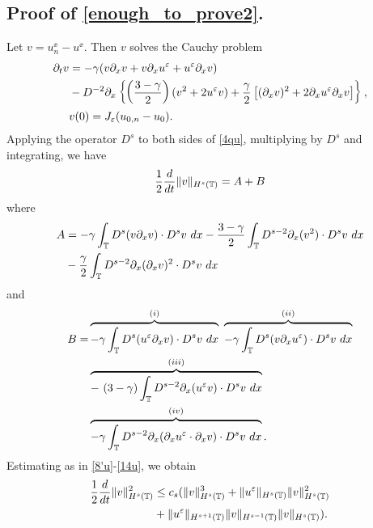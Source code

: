 \subsection{Proof of \eqref{enough_to_prove2}.} 
Let $v = u^\ee_n - u^\ee$. Then $v$ solves the Cauchy problem
\begin{align}
\label{4qu}
\partial_t v 
& =  -\gamma (v \partial_x v + v \partial_x u^\varepsilon + u^\varepsilon \partial_x v)  
\\
& - D^{-2} \partial_x \left\{ \left (\frac{3-\gamma}{2} \right )(v^2 +
2u^\varepsilon v) + \frac{\gamma}{2}\left[ (\partial_x v)^2 + 2 \partial_x u^\varepsilon \partial_x v \right]
\right\}, \notag
\\
& v(0) =J_\varepsilon(u_{0,n} - u_0).
\label{5qu}
\end{align}
Applying the operator $D^s$ to both sides of \eqref{4qu}, multiplying by
$D^s$ and integrating, we have
\begin{equation}
\begin{split}
\frac{1}{2}\frac{d}{dt} \|v\|_{H^s(\mathbb{T})} = A + B
\label{6qu}
\end{split}
\end{equation}
where
\begin{equation}
\begin{split}
A
& =  -\gamma \int_{\mathbb{T}} D^s(v \partial_x v) \cdot D^s v \
dx
- \frac{3- \gamma}{2} \int_{\mathbb{T}} D^{s-2} \partial_x (v^2) \cdot D^s v
\ dx
\\
& - \frac{\gamma}{2}\int_{\mathbb{T}} D^{s-2} \partial_x (\partial_x v)^2 \cdot D^s
v \ dx
\label{7qu}
\end{split}
\end{equation}
and
\begin{equation}
\begin{split}
B 
= &  \overbrace{-\gamma \int_{\mathbb{T}} D^s (u^\varepsilon \partial_x v) \cdot D^s v \
dx}^{(i)}
\ \overbrace{-\gamma \int_{\mathbb{T}} D^s (v \partial_x u^\varepsilon ) \cdot D^s v \
dx}^{(ii)}
\\
& \overbrace{- \ ( 3- \gamma) \int_{\mathbb{T}} D^{s-2} \partial_x (u^\varepsilon v) \cdot D^s
v \ dx}^{(iii)}
\\
& \overbrace{-\gamma \int_{\mathbb{T}} D^{s-2} \partial_x
(\partial_x u^\varepsilon \cdot \partial_x v) \cdot D^s v \
dx}^{(iv)}.
\label{8qu}
\end{split}
\end{equation}
Estimating as in \eqref{8'u}-\eqref{14u}, we obtain
\begin{equation}
\begin{split}
\frac{1}{2}\frac{d}{dt}\|v\|_{H^{s}(\mathbb{T})}^2
& \le c_s(\|v\|_{H^s(\mathbb{T})}^3 + \|u^\varepsilon\|_{H^s(\mathbb{T})}
\|v\|_{H^s(\mathbb{T})}^2
\\
& + \|u^\varepsilon\|_{H^{s+1}(\mathbb{T})}
\|v\|_{H^{s-1}(\mathbb{T})} \|v\|_{H^s(\mathbb{T})}).
\label{15qu}
\end{split}
\end{equation}
